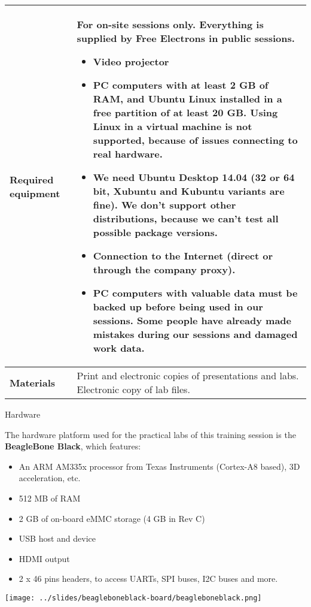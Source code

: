 \documentclass[a4paper,12pt,obeyspaces,spaces,hyphens]{article}
\begin{document}
{  \begin{tabularx}{\textwidth}{|g|h|}
    {\bf Required equipment} &
    {\bf For on-site sessions only.}
    \newline Everything is supplied by Free Electrons in public
    sessions.
    \begin{itemize}
    \item Video projector
    \item PC computers with at least 2 GB of RAM, and Ubuntu Linux
    installed in a {\bf free partition of at least 20 GB. Using Linux
      in a virtual machine is not supported}, because of issues
    connecting to real hardware.
    \item We need Ubuntu Desktop 14.04 (32 or 64 bit, Xubuntu and
    Kubuntu variants are fine). We don't support other
    distributions, because we can't test all possible package versions.
    \item {\bf Connection to the Internet} (direct or through the
    company proxy).
    \item {\bf PC computers with valuable data must be backed up}
    before being used in our sessions.  Some people have already made
    mistakes during our sessions and damaged work data.
    \end{itemize}\\
    \hline

    {\bf Materials} & Print and electronic copies of presentations and
    labs.
    \newline Electronic copy of lab files.\\
    \hline

\end{tabularx}}
\normalsize

\feagendatwocolumn
{Hardware}
{
  The hardware platform used for the practical labs of this training
  session is the {\bf BeagleBone Black}, which features:

  \begin{itemize}
  \item An ARM AM335x processor from Texas Instruments (Cortex-A8
    based), 3D acceleration, etc.
  \item 512 MB of RAM
  \item 2 GB of on-board eMMC storage
  	\newline(4 GB in Rev C)
  \item USB host and device
  \item HDMI output
  \item 2 x 46 pins headers, to access UARTs, SPI buses, I2C buses
    and more.
  \end{itemize}
}
{}
{
  \begin{center}
    \texttt{[image: ../slides/beagleboneblack-board/beagleboneblack.png]}
  \end{center}
}
\end{document}
